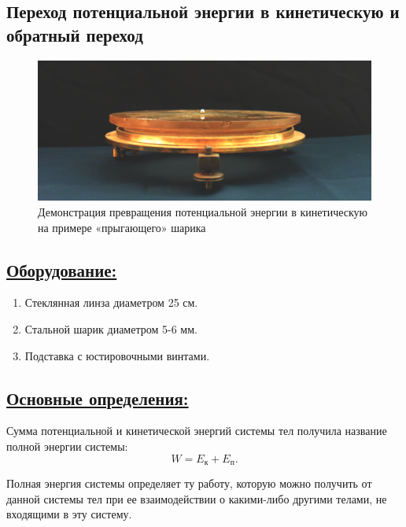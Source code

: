 \documentclass[14pt,a4paper,oneside]{extarticle}	%
\begin{document}

\begin{center}
	\subsection*{Переход потенциальной энергии в кинетическую и обратный переход}
\end{center}

\begin{figure}[H] 
	\centering 	
	\includegraphics[width=0.8\linewidth]{transform-1.png}
	\caption{Демонстрация превращения потенциальной энергии в кинетическую на примере «прыгающего» шарика}
	\label{transform-1}
\end{figure}

\subsection*{\underline{Оборудование:}}

\begin{enumerate}
	\item Стеклянная линза диаметром 25 см. 
	\item Стальной шарик диаметром 5-6 мм.
	\item Подставка с юстировочными винтами.
\end{enumerate}

\subsection*{\underline{Основные определения:}}

Сумма потенциальной и кинетической энергий системы тел 
получила название полной энергии системы: 
$$
	W=E_\text{к} + E_\text{п}.
$$

Полная энергия системы определяет ту работу, которую можно 
получить от данной системы тел при ее взаимодействии о какими-либо другими телами, не входящими в эту систему. 
\end{document}
